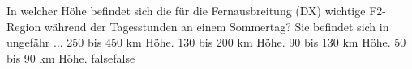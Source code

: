     {In welcher Höhe befindet sich die für die Fernausbreitung (DX) wichtige F2-Region während der Tagesstunden an einem Sommertag? Sie befindet sich in ungefähr ...}
    {250 bis 450 km Höhe.}
    {130 bis 200 km Höhe.}
    {90 bis 130 km Höhe.}
    {50 bis 90 km Höhe.}
    {false}{false}
